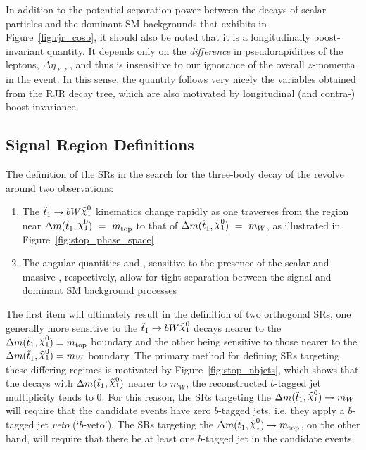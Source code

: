 In addition to the potential separation power between the decays of scalar \stopone particles
and the dominant SM backgrounds that \cosb exhibits in Figure~\ref{fig:rjr_cosb}, it should also
be noted that it is a longitudinally boost-invariant quantity.
It depends only on the \textit{difference} in pseudorapidities of the leptons, $\Delta \eta_{\ell\ell}$,
and thus is insensitive to our ignorance of the overall $z$-momenta in the event.
In this sense, the quantity \cosb follows very nicely the variables obtained from the RJR decay tree,
which are also motivated by longitudinal (and contra-) boost invariance.

\FloatBarrier
%
%
\subsection{Signal Region Definitions}
\label{sec:stop_signal_region}

The definition of the SRs in the search for the three-body decay of the \stopone revolve around
two observations:
\begin{enumerate}
    \item The $\stopone \rightarrow b W \ninoone$ kinematics change rapidly as one traverses from
        the region near $\sdiff~ = ~m_{\text{top}}$ to that of $\sdiff~ = ~m_W$,
        as illustrated in Figure~\ref{fig:stop_phase_space}
    \item The angular quantities \cosb and \dpb,  sensitive to the presence of the scalar \stopone and massive
        \ninoone, respectively, allow for tight separation between the \stopone signal and dominant
        SM background processes
\end{enumerate}
The first item will ultimately result in the definition of two orthogonal SRs, one generally
more sensitive to the $\bWN$ decays nearer to the $\sdiff = m_{\text{top}}$ boundary
and the other being sensitive to those nearer to the $\sdiff = m_W$ boundary.
The primary method for defining SRs targeting these differing regimes is motivated by Figure~\ref{fig:stop_nbjets},
which shows that the \bWN decays with $\sdiff$ nearer to $m_W$, the reconstructed $b$-tagged
jet multiplicity tends to 0.
For this reason, the SRs targeting the $\sdiff \rightarrow m_W$ will require that the
candidate events have zero $b$-tagged jets, i.e. they apply a $b$-tagged jet \textit{veto} (`$b$-veto').
The SRs targeting the $\sdiff \rightarrow m_{\text{top}}$, on the other hand, will
require that there be at least one $b$-tagged jet in the candidate events.

